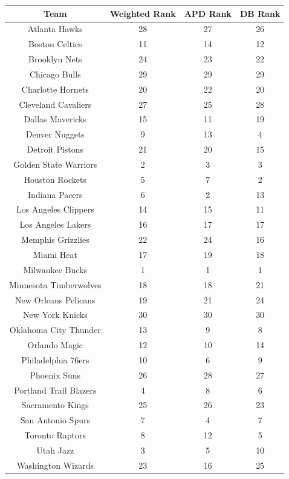\documentclass[12pt]{article}%
\begin{document}
\begin{center}
\begin{tabular}{|c|c |c |c|}
\hline
\textbf{Team} & \textbf{Weighted Rank} & \textbf{APD Rank} & \textbf{DB Rank}\\
\hline
Atlanta Hawks & 28& 27& 26\\\hline
Boston Celtics &11 &14 &12 \\\hline
Brooklyn Nets & 24& 23&22 \\\hline
Chicago Bulls & 29& 29& 29\\\hline
Charlotte Hornets & 20& 22&20 \\\hline
Cleveland Cavaliers &27 & 25& 28 \\\hline
Dallas Mavericks & 15&11 &19 \\\hline
Denver Nuggets & 9& 13&4 \\\hline
Detroit Pistons & 21& 20&15 \\\hline
Golden State Warriors & 2& 3&3 \\\hline
Houston Rockets & 5&7 &2 \\\hline
Indiana Pacers & 6& 2& 13\\\hline
Los Angeles Clippers &14 & 15&11 \\\hline
Los Angeles Lakers & 16& 17&17 \\\hline
Memphis Grizzlies & 22& 24&16 \\\hline
Miami Heat & 17& 19&18 \\\hline
Milwaukee Bucks & 1& 1& 1\\\hline
Minnesota Timberwolves & 18& 18&21 \\\hline
New Orleans Pelicans & 19& 21&24 \\\hline
New York Knicks & 30& 30& 30\\\hline
Oklahoma City Thunder &13 &9 &8 \\\hline
Orlando Magic & 12&10 &14 \\\hline
Philadelphia 76ers &10 &6 &9 \\\hline
Phoenix Suns & 26& 28& 27\\\hline
Portland Trail Blazers  &4 &8 &6 \\\hline
Sacramento Kings & 25&26 &23 \\\hline
San Antonio Spurs & 7& 4&7 \\\hline
Toronto Raptors & 8& 12&5 \\\hline
Utah Jazz &3 & 5& 10 \\\hline
Washington Wizards & 23& 16& 25\\\hline
\end{tabular}
\end{center}
\end{document}
